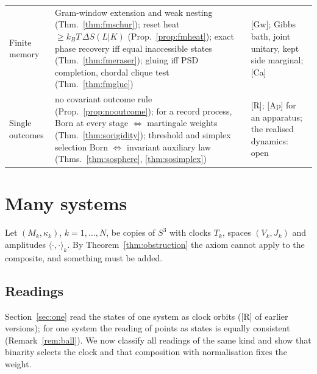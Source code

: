 \documentclass[aps,pra,onecolumn,superscriptaddress,nofootinbib,10pt]{revtex4-2}
\theoremstyle{definition}
\theoremstyle{remark}
\newcommand{\ip}[2]{\langle #1,#2\rangle}
\begin{document}
\begin{table}[h]
\begin{tabular}{@{}p{}p{}p{}@{}}
Finite memory & Gram-window extension and weak nesting (Thm.~\ref{thm:fmschur}); reset heat $\ge k_BT\,\Delta S(L|K)$ (Prop.~\ref{prop:fmheat}); exact phase recovery iff equal inaccessible states (Thm.~\ref{thm:fmeraser}); gluing iff PSD completion, chordal clique test (Thm.~\ref{thm:fmglue}) & [Gw]; Gibbs bath, joint unitary, kept side marginal; [Ca]\\
Single outcomes & no covariant outcome rule (Prop.~\ref{prop:nooutcome}); for a record process, Born at every stage $\Leftrightarrow$ martingale weights (Thm.~\ref{thm:sorigidity}); threshold and simplex selection Born $\Leftrightarrow$ invariant auxiliary law (Thms.~\ref{thm:sosphere}, \ref{thm:sosimplex}) & [R]; [Ap] for an apparatus; the realised dynamics: open\\
\bottomrule
\end{tabular}
\end{table}

\section{Many systems}\label{sec:many}
Let $(M_k,\kappa_k)$, $k=1,\dots,N$, be copies of $S^3$ with clocks $T_k$, spaces $(V_k,J_k)$ and
amplitudes $\ip{\cdot}{\cdot}_k$.  By Theorem~\ref{thm:obstruction} the axiom cannot apply to the
composite, and something must be added.

\subsection{Readings}\label{sec:readings}
Section~\ref{sec:one} read the states of one system as clock orbits ([R] of earlier versions); for one
system the reading of points as states is equally consistent (Remark~\ref{rem:ball}).  We now classify
all readings of the same kind and show that binarity selects the clock and that composition with
normalisation fixes the weight.
\end{document}

